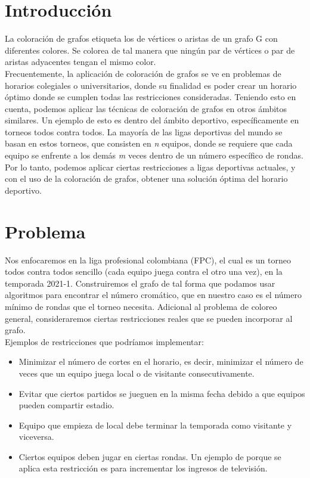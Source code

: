\documentclass[11pt]{article}
\begin{document}
    \begin{multicols}{2}
    \setcounter{page}{1}

        \section{Introducción}
            La coloración de grafos etiqueta los de vértices o aristas de un grafo G con diferentes colores. 
            Se colorea de tal manera que ningún par de vértices o par de aristas adyacentes tengan el mismo color.\\
            Frecuentemente, la aplicación de coloración de grafos se ve en problemas de horarios colegiales o 
            universitarios, donde su finalidad es poder crear un horario óptimo donde se cumplen todas las restricciones consideradas. 
            Teniendo esto en cuenta, podemos aplicar las técnicas de coloración de grafos en otros ámbitos similares. 
            Un ejemplo de esto es dentro del ámbito deportivo, específicamente en torneos todos contra todos. La mayoría de las 
            ligas deportivas del mundo se basan en estos torneos, que consisten en \textit{n} equipos, donde se requiere que cada equipo se 
            enfrente a los demás \textit{m} veces dentro de un número específico de rondas. Por lo tanto, podemos aplicar ciertas 
            restricciones a ligas deportivas actuales, y con el uso de la coloración de grafos, obtener una solución óptima 
            del horario deportivo. 

        \section{Problema}
            Nos enfocaremos en la liga profesional colombiana (FPC), el cual es un torneo todos contra todos sencillo 
            (cada equipo juega contra el otro una vez), en la temporada 2021-1. Construiremos el grafo de tal forma que podamos 
            usar algoritmos para encontrar el número cromático, que en nuestro caso es el número mínimo de rondas que el torneo necesita.
            Adicional al problema de coloreo general, consideraremos ciertas restricciones reales que se pueden incorporar al grafo.\\[10pt]
            Ejemplos de restricciones que podríamos implementar:

            \begin{itemize}
                \item Minimizar el número de cortes en el horario, es decir, minimizar el número de veces que un equipo juega local o de visitante consecutivamente.
                \item Evitar que ciertos partidos se jueguen en la misma fecha debido a que equipos pueden compartir estadio.
                \item Equipo que empieza de local debe terminar la temporada como visitante y viceversa.
                \item Ciertos equipos deben jugar en ciertas rondas. Un ejemplo de porque se aplica esta restricción es para incrementar los ingresos de televisión.
            \end{itemize}
   

\end{multicols}
\end{document}
